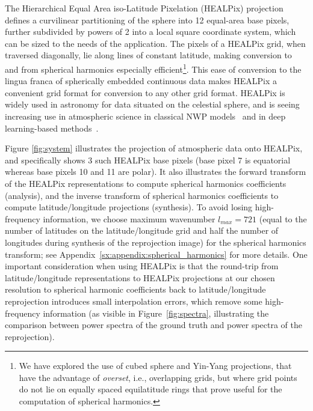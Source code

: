 The Hierarchical Equal Area iso-Latitude Pixelation (HEALPix) projection~\citep{gorski1999healpix} defines a curvilinear partitioning of the sphere into 12 equal-area base pixels, further subdivided by powers of 2 into a local square coordinate system, which can be sized to the needs of the application.
The pixels of a HEALPix grid, when traversed diagonally, lie along lines of constant latitude, making conversion to and from spherical harmonics especially efficient\footnote{We have explored the use of cubed sphere \citep{ronchi1996cubed,lin1997cubedsphere} and Yin-Yang \citep{cote1998gem,ohno2009visualization} projections, that have the advantage of \emph{overset}, i.e., overlapping grids, but where grid points do not lie on equally spaced equilatitude rings that prove useful for the computation of spherical harmonics.}.
This ease of conversion to the lingua franca of spherically embedded continuous data makes HEALPix a convenient grid format for conversion to any other grid format.
HEALPix is widely used in astronomy for data situated on the celestial sphere, and is seeing increasing use in atmospheric science in classical NWP models~\citep{karlbauer2023advancing} and in deep learning-based methods~\citep{ramavajjala2024heal, chang2023seamless}. %

Figure \ref{fig:system} illustrates the projection of atmospheric data onto HEALPix, and specifically shows 3 such HEALPix base pixels (base pixel 7 is equatorial whereas base pixels 10 and 11 are polar). It also illustrates the forward transform of the HEALPix representations to compute spherical harmonics coefficients (analysis), and the inverse transform of spherical harmonics coefficients to compute latitude/longitude projections (synthesis). To avoid losing high-frequency information, we choose maximum wavenumber $l_{max}=721$ (equal to the number of latitudes on the latitude/longitude grid and half the number of longitudes during synthesis of the reprojection image) for the spherical harmonics transform; see Appendix~\ref{sx:appendix:spherical_harmonics} for more details. One important consideration when using HEALPix is that the round-trip from latitude/longitude representations to HEALPix projections at our chosen resolution to spherical harmonic coefficients back to latitude/longitude reprojection introduces small interpolation errors, which remove some high-frequency information (as visible in Figure~\ref{fig:spectra}, illustrating the comparison between power spectra of the ground truth and power spectra of the reprojection).

